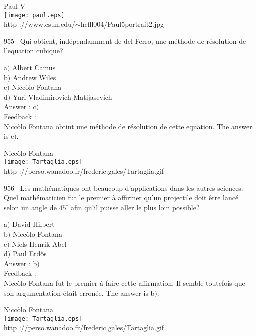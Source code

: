 \documentclass[letterpaper, 12pt]{article}
\begin{document}
        \begin{center}
        Paul V\\
    \texttt{[image: paul.eps]}\\
        {\footnotesize http
://www.csun.edu/$\sim$hcfll004/Paul5portrait2.jpg}
    \end{center}

955-- Qui obtient, ind\'ependamment de del Ferro, une m\'ethode de
r\'esolution de l'equation cubique?

a$)$ Albert Camus \\
b$)$ Andrew Wiles \\
c$)$ Nicc\`olo Fontana  \\
d$)$ Yuri Vladimirovich Matijasevich \\

Answer : c$)$\\

Feedback : \\
Nicc\`olo Fontana obtint une m\'ethode de r\'esolution de cette equation.
The answer is c$)$.\\

        \begin{center}
        Nicc\`olo Fontana\\
    \texttt{[image: Tartaglia.eps]}\\
        {\footnotesize http
://perso.wanadoo.fr/frederic.gales/Tartaglia.gif}
    \end{center}

956-- Les math\'ematiques ont beaucoup d'applications dans les
autres sciences. Quel math\'ematicien fut le premier \`a affirmer
qu'un projectile doit \^etre lanc\'e selon un angle de $45^{\circ}$
afin qu'il puisse aller le plus loin possible?

a$)$ David Hilbert \\
b$)$ Nicc\`olo Fontana  \\
c$)$ Niels Henrik Abel  \\
d$)$ Paul Erd\H{o}s\\

Answer : b$)$\\

Feedback : \\
Nicc\`olo Fontana fut le premier \`a faire cette affirmation. Il
semble toutefois que son
argumentation \'etait erron\'ee. The answer is b$)$.\\

        \begin{center}
        Nicc\`olo Fontana\\
    \texttt{[image: Tartaglia.eps]}\\
        {\footnotesize http
://perso.wanadoo.fr/frederic.gales/Tartaglia.gif}
    \end{center}
\end{document}
